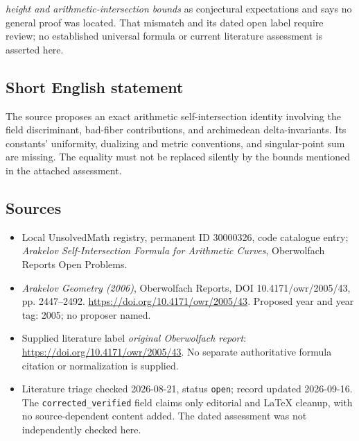 \documentclass[11pt]{article}
\begin{document}
\emph{height and arithmetic-intersection bounds} as conjectural expectations and says no general proof was located. That mismatch and its dated open label require review; no established universal formula or current literature assessment is asserted here.
\subsection{Short English statement}
The source proposes an exact arithmetic self-intersection identity involving the field discriminant, bad-fiber contributions, and archimedean delta-invariants. Its constants' uniformity, dualizing and metric conventions, and singular-point sum are missing. The equality must not be replaced silently by the bounds mentioned in the attached assessment.
\subsection{Sources}
\begin{itemize}\item Local UnsolvedMath registry, permanent ID 30000326, code catalogue entry; \emph{Arakelov Self-Intersection Formula for Arithmetic Curves}, Oberwolfach Reports Open Problems.\item \emph{Arakelov Geometry (2006)}, Oberwolfach Reports, DOI 10.4171/owr/2005/43, pp. 2447--2492. \url{https://doi.org/10.4171/owr/2005/43}. Proposed year and year tag: 2005; no proposer named.\item Supplied literature label \emph{original Oberwolfach report}: \url{https://doi.org/10.4171/owr/2005/43}. No separate authoritative formula citation or normalization is supplied.\item Literature triage checked 2026-08-21, status \texttt{open}; record updated 2026-09-16. The \texttt{corrected\_verified} field claims only editorial and LaTeX cleanup, with no source-dependent content added. The dated assessment was not independently checked here.\end{itemize}
\end{document}
